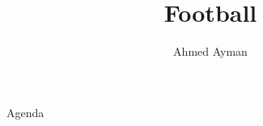 \documentclass{beamer}
\title{Football}
\author{Ahmed Ayman}
\begin{document}
        \maketitle
        
        \begin{frame}[t]{Agenda}
        \end{frame}

    
\end{document}
